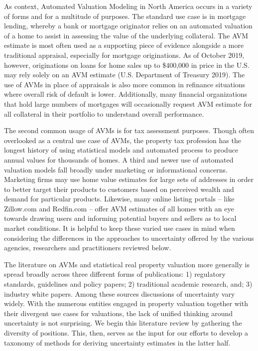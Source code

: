 \documentclass[colTwo]{anon}
\theoremstyle{definition}
\begin{document}
As context, Automated Valuation Modeling in North America occurs in a variety of forms and for a multitude of purposes. The standard use case is in mortgage lending, whereby a bank or mortgage originator relies on an automated valuation of a home to assist in assessing the value of the underlying collateral.  The AVM estimate is most often used as a supporting piece of evidence alongside a more traditional appraisal, especially for mortgage originations. As of October 2019, however, originations on loans for home sales up to \$400,000 in price in the U.S. may rely solely on an AVM estimate (U.S. Department of Treasury 2019). The use of AVMs in place of appraisals is also more common in refinance situations where overall risk of default is lower. Additionally, many financial organizations that hold large numbers of mortgages will occasionally request AVM estimate for all collateral in their portfolio to understand overall performance.  

The second common usage of AVMs is for tax assessment purposes.  Though often overlooked as a central use case of AVMs, the property tax profession has the longest history of using statistical models and automated process to produce annual values for thousands of homes.  A third and newer use of automated valuation models fall broadly under marketing or informational concerns.  Marketing firms may use home value estimates for large sets of addresses in order to better target their products to customers based on perceived wealth and demand for particular products.  Likewise, many online listing portals -- like Zillow.com and Redfin.com -- offer AVM estimates of all homes with an eye towards drawing users and informing potential buyers and sellers as to local market conditions. It is helpful to keep these varied use cases in mind when considering the differences in the approaches to uncertainty offered by the various agencies, researchers and practitioners reviewed below.  

The literature on AVMs and statistical real property valuation more generally is spread broadly across three different forms of publications: 1) regulatory standards, guidelines and policy papers; 2) traditional academic research, and; 3) industry white papers.  Among these sources discussions of uncertainty vary widely.  With the numerous entities engaged in property valuation together with their divergent use cases for valuations, the lack of unified thinking around uncertainty is not surprising.  We begin this literature review by gathering the diversity of positions.  This, then, serves as the input for our efforts to develop a taxonomy of methods for deriving uncertainty estimates in the latter half.    
\end{document}
